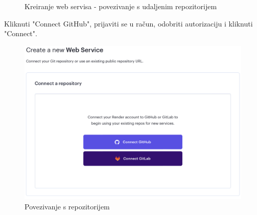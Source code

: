 \begin{enumerate}
\begin{figure}[H]
				\centering
				\caption{Kreiranje web servisa - povezivanje s udaljenim repozitorijem}
				\label{fig:promjene}
			\end{figure}
			\pagebreak
			Kliknuti "Connect GitHub", prijaviti se u račun, odobriti autorizaciju i kliknuti "Connect".
			\begin{figure}[H]
				\includegraphics[scale=0.25]{slike/deploy/backend2.png} %
				\centering
				\caption{Povezivanje s repozitorijem}
				\label{fig:promjene}
			\end{figure}
			

\end{enumerate}
